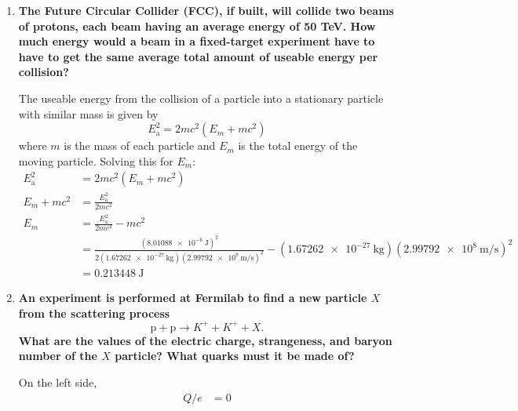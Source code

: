 \documentclass[11pt]{article}
\begin{document}
\begin{enumerate}[label=\textbf{\arabic*.}]
{\begin{enumerate}[label=\textbf{(\alph*)}]
{\begin{enumerate}[label=\textbf{(\roman*)}]
                        \item{
                            \textbf{\boldmath \(\mathrm{p}+\bar{\mathrm{p}}\rightarrow\gamma+\gamma+\gamma\)}
                            \par
                            On the left side, \(B=1-1=0\). On the right side, \(B=0\). Baryon number is conserved, so this is allowed.
                        }
                    \end{enumerate}
                }
                \item{
                    \textbf{The Future Circular Collider (FCC), if built, will collide two beams of protons, each beam having an average energy of 50 TeV. How much energy would a beam in a fixed-target experiment have to have to get the same average total amount of useable energy per collision?}
                    \par
                    The useable energy from the collision of a particle into a stationary particle with similar mass is given by \[E_\mathrm{a}^2=2mc^2(E_m+mc^2)\]
                    where \(m\) is the mass of each particle and \(E_m\) is the total energy of the moving particle. Solving this for \(E_m\):
                    \begin{align*}
                        E_\mathrm{a}^2&=2mc^2(E_m+mc^2) \\
                        E_m+mc^2&=\frac{E_\mathrm{a}^2}{2mc^2} \\
                        E_m&=\frac{E_\mathrm{a}^2}{2mc^2}-mc^2 \\
                        &=\tfrac{(\SI{8.01088e-6}{\joule})^2}{2(\SI{1.67262e-27}{\kilogram})(\SI{2.99792e8}{\meter\per\second})^2}-(\SI{1.67262e-27}{\kilogram})(\SI{2.99792e8}{\meter\per\second})^2 \\
                        &=\SI{0.213448}{\joule}
                    \end{align*}
                }
                \item{
                    \textbf{\boldmath An experiment is performed at Fermilab to find a new particle \(X\) from the scattering process \[\mathrm{p}+\mathrm{p}\rightarrow K^++K^++X.\] What are the values of the electric charge, strangeness, and baryon number of the \(X\) particle? What quarks must it be made of?}
                    \par
                    On the left side, 
                    \begin{align*}
                        Q/e&=0 \\

\end{align*}}
\end{enumerate}}
\end{enumerate}
\end{document}
